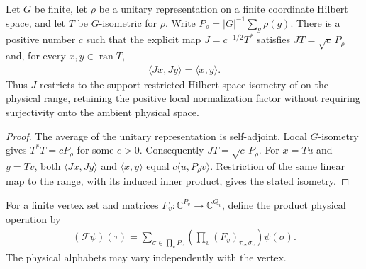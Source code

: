 
\begin{lemma}%
    \label{thm:peps_g_isometric_support_coordinates}
    \leanok
    Let $G$ be finite, let $\rho$ be a unitary representation on a finite
    coordinate Hilbert space, and let $T$ be $G$-isometric for $\rho$.
    Write $P_\rho=|G|^{-1}\sum_g\rho(g)$. There is a positive number $c$ such
    that the explicit map $J=c^{-1/2}T^*$ satisfies $JT=\sqrt c\,P_\rho$ and,
    for every $x,y\in\operatorname{ran}T$,
    \begin{align}
        \langle Jx,Jy\rangle=\langle x,y\rangle.
    \end{align}
    Thus $J$ restricts to the support-restricted Hilbert-space isometry of
    \cite[Observation~6.4]{Schuch2010PEPS} on the physical range, retaining the
    positive local normalization factor without requiring surjectivity onto the
    ambient physical space.
\end{lemma}

\begin{proof}\leanok
    The average of the unitary representation is self-adjoint.
    Local $G$-isometry gives $T^*T=cP_\rho$ for some $c>0$.
    Consequently $JT=\sqrt c\,P_\rho$. For $x=Tu$ and $y=Tv$, both
    $\langle Jx,Jy\rangle$ and $\langle x,y\rangle$ equal
    $c\langle u,P_\rho v\rangle$. Restriction of the same linear map to the
    range, with its induced inner product, gives the stated isometry.
\end{proof}

\begin{definition}%
    \label{def:peps_graph_physical_product_map}
    \leanok
    For a finite vertex set and matrices $F_v:\mathbb C^{P_v}\to
        \mathbb C^{Q_v}$, define the product physical operation by
    \begin{align}
        (\mathcal F\psi)(\tau)
        =\sum_{\sigma\in\prod_v P_v}
        \left(\prod_v(F_v)_{\tau_v,\sigma_v}\right)\psi(\sigma).
    \end{align}
    The physical alphabets may vary independently with the vertex.
\end{definition}

